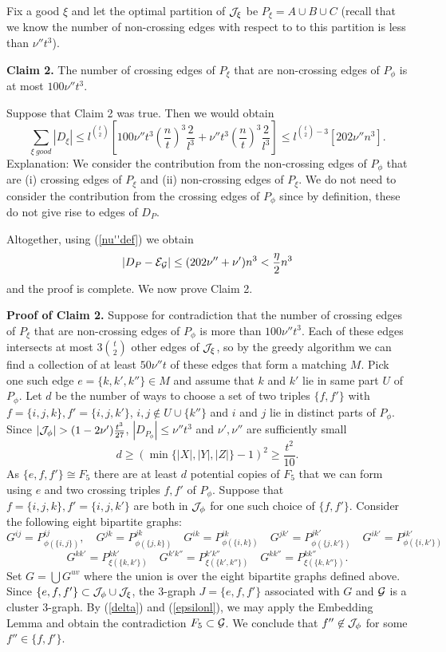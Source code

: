 \documentclass[11pt]{article}
\begin{document}
 Fix a good $\xi$ and let the optimal partition of ${\cal J}_{\xi}$ be $P_{\xi}=A \cup B \cup C$
 (recall that we know the number of non-crossing edges with respect to to this partition is less than $\nu''t^3$).

{\bf Claim 2.} The number of crossing edges of $P_{\xi}$ that are
non-crossing edges of $P_{\phi}$ is at most $100\nu''t^3$.

Suppose that  Claim 2 was true. Then we would obtain
$$\sum_{\xi \ good} |D_{\xi}| \le l^{{t\choose 2}}\left[100\nu''t^3(\frac{n}{t})^3\frac{2}{l^3}+
\nu''t^3(\frac{n}{t})^3\frac{2}{l^3}\right]\le l^{{t\choose
2}-3}\left[202\nu''n^3\right].$$ Explanation: We consider the
contribution from the non-crossing edges of $P_{\phi}$ that are (i)
crossing edges of $P_{\xi}$ and (ii) non-crossing edges of
$P_{\xi}$. We do not need to consider the contribution from the
crossing edges of $P_{\phi}$ since by definition, these do not give
rise to edges of $D_P$.

Altogether, using (\ref{nu''def}) we  obtain
$$|D_P-{\cal E}_{{{\cal G}}}| \le (202\nu''+\nu')n^3<\frac{\eta}{2} n^3$$
and the proof is complete.  We now  prove Claim 2.

{\bf Proof of Claim 2.}  Suppose for contradiction that the number
of crossing edges of $P_{\xi}$ that are non-crossing edges of
$P_{\phi}$ is more than $100\nu'' t^3$. Each of these edges intersects at most $3{t \choose 2}$ other edges of ${\cal J}_{\xi}$,
 so by the greedy algorithm we can find a
collection of at least $50\nu''t$ of these edges that form a matching $M$. Pick one such edge $e=\{k,k', k''\}\in M$ and assume that $k$ and $k'$ lie in same part $U$ of $P_{\phi}$. Let $d$ be the number of ways to choose a set of two triples $\{f, f'\}$ with $f=\{i,j,k\}, f'=\{i,j,k'\}$, $i,j \not\in U\cup \{k''\}$ and $i$ and $j$ lie in distinct parts of $P_{\phi}$.
Since $|\cJ_{\phi}|>(1-2\nu')\frac{t^3}{27}$, $|D_{P_{\phi}}|\le \nu'' t^3$ and $\nu', \nu''$ are sufficiently small
$$d\ge (\min\{|X|, |Y|, |Z|\} -1)^2\ge \frac{t^2}{10}.$$ As $\{e,f,f'\}\cong F_5$
there
are at least $d$ potential copies of $F_5$ that we can
form using $e$ and two crossing triples $f,f'$ of $P_{\phi}$.  Suppose that $f=\{i,j,k\}, f'=\{i,j,k'\}$
are both in  ${\cal J}_{\phi}$ for one such choice of $\{f,f'\}$. Consider the following eight bipartite graphs:
$$G^{ij}=P_{\phi(\{i,j\})}^{ij}, \quad G^{jk}=P_{\phi(\{j,k\})}^{jk} \quad G^{ik}=
P_{\phi(\{i,k\})}^{ik}\quad G^{jk'}=P_{\phi(\{j,k'\})}^{jk'}\quad
G^{ik'}=P_{\phi(\{i,k'\})}^{ik'}$$
$$G^{kk'}=P_{\xi(\{k, k'\})}^{kk'}\quad G^{k'k''}=P_{\xi(\{k', k''\})}^{k'k''}\quad G^{kk''}=P_{\xi(\{k, k''\})}^{kk''}.$$
Set $G=\bigcup G^{uv}$ where the union is over the eight bipartite graphs defined above.
 Since $\{e,f,f'\} \subset {\cal J}_{\phi} \cup {\cal J}_{\xi}$, the 3-graph  $J=\{e, f,f'\}$ associated with $G$ and ${{\cal G}}$
 is a cluster 3-graph.
By (\ref{delta}) and (\ref{epsilonl}), we may apply the Embedding Lemma and obtain the contradiction  $F_5 \subset {{\cal G}}$.
We conclude that $f''\not\in {\cal J}_{\phi}$ for some $f''\in \{f, f'\}$.
\end{document}

